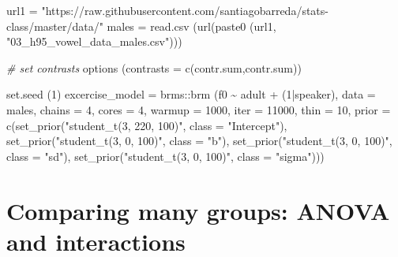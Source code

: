 \documentclass[
]{book}
\newenvironment{Shaded}{\begin{snugshade}}{\end{snugshade}}
\newcommand{\AttributeTok}[1]{\textcolor[rgb]{0.77,0.63,0.00}{#1}}
\newcommand{\CommentTok}[1]{\textcolor[rgb]{0.56,0.35,0.01}{\textit{#1}}}
\newcommand{\DecValTok}[1]{\textcolor[rgb]{0.00,0.00,0.81}{#1}}
\newcommand{\FunctionTok}[1]{\textcolor[rgb]{0.00,0.00,0.00}{#1}}
\newcommand{\NormalTok}[1]{#1}
\newcommand{\OtherTok}[1]{\textcolor[rgb]{0.56,0.35,0.01}{#1}}
\newcommand{\SpecialCharTok}[1]{\textcolor[rgb]{0.00,0.00,0.00}{#1}}
\newcommand{\StringTok}[1]{\textcolor[rgb]{0.31,0.60,0.02}{#1}}
\begin{document}
\begin{Shaded}
\begin{Highlighting}[]
\NormalTok{url1 }\OtherTok{=} \StringTok{"https://raw.githubusercontent.com/santiagobarreda/stats{-}class/master/data/"}
\NormalTok{males }\OtherTok{=} \FunctionTok{read.csv}\NormalTok{ (}\FunctionTok{url}\NormalTok{(}\FunctionTok{paste0}\NormalTok{ (url1, }\StringTok{"03\_h95\_vowel\_data\_males.csv"}\NormalTok{)))}

\CommentTok{\# set contrasts}
\FunctionTok{options}\NormalTok{ (}\AttributeTok{contrasts =} \FunctionTok{c}\NormalTok{(}\StringTok{\textquotesingle{}contr.sum\textquotesingle{}}\NormalTok{,}\StringTok{\textquotesingle{}contr.sum\textquotesingle{}}\NormalTok{))}

\FunctionTok{set.seed}\NormalTok{ (}\DecValTok{1}\NormalTok{)}
\NormalTok{excercise\_model }\OtherTok{=}  
\NormalTok{  brms}\SpecialCharTok{::}\FunctionTok{brm}\NormalTok{ (f0 }\SpecialCharTok{\textasciitilde{}}\NormalTok{ adult }\SpecialCharTok{+}\NormalTok{ (}\DecValTok{1}\SpecialCharTok{|}\NormalTok{speaker), }\AttributeTok{data =}\NormalTok{ males, }\AttributeTok{chains =} \DecValTok{4}\NormalTok{, }\AttributeTok{cores =} \DecValTok{4}\NormalTok{,}
       \AttributeTok{warmup =} \DecValTok{1000}\NormalTok{, }\AttributeTok{iter =} \DecValTok{11000}\NormalTok{, }\AttributeTok{thin =} \DecValTok{10}\NormalTok{,}
       \AttributeTok{prior =} \FunctionTok{c}\NormalTok{(}\FunctionTok{set\_prior}\NormalTok{(}\StringTok{"student\_t(3, 220, 100)"}\NormalTok{, }\AttributeTok{class =} \StringTok{"Intercept"}\NormalTok{),}
                 \FunctionTok{set\_prior}\NormalTok{(}\StringTok{"student\_t(3, 0, 100)"}\NormalTok{, }\AttributeTok{class =} \StringTok{"b"}\NormalTok{),}
                 \FunctionTok{set\_prior}\NormalTok{(}\StringTok{"student\_t(3, 0, 100)"}\NormalTok{, }\AttributeTok{class =} \StringTok{"sd"}\NormalTok{),}
                 \FunctionTok{set\_prior}\NormalTok{(}\StringTok{"student\_t(3, 0, 100)"}\NormalTok{, }\AttributeTok{class =} \StringTok{"sigma"}\NormalTok{)))}
\end{Highlighting}
\end{Shaded}

\hypertarget{comparing-many-groups-anova-and-interactions}{%
\chapter{Comparing many groups: ANOVA and interactions}\label{comparing-many-groups-anova-and-interactions}}
\end{document}
